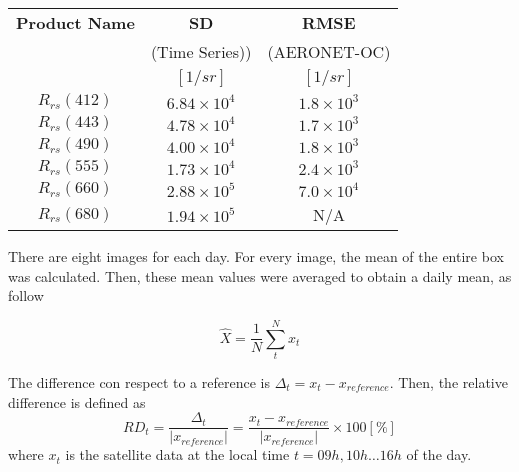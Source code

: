 \documentclass[onecolumn,3p,letterpaper,11pt]{elsarticle}
\begin{document}
\begin{table}[htbp!]
\caption{ \label{tab:stdev_aero} } 
\small
\centering
\begin{tabular}{ccc} \hline
 \bfseries{Product Name} & \bfseries{SD} & \bfseries{RMSE}\\
 & (Time Series)) & (AERONET-OC) \\ 
 & $[1/sr]$ & $[1/sr]$ \\ \hline \hline
$R_{rs}(412)$ & $6.84\times10^4$ & $1.8\times10^3$\\ 
$R_{rs}(443)$ & $4.78\times10^4$ & $1.7\times10^3$\\ 
$R_{rs}(490)$ & $4.00\times10^4$ & $1.8\times10^3$\\ 
$R_{rs}(555)$ & $1.73\times10^4$ & $2.4\times10^3$\\ 
$R_{rs}(660)$ & $2.88\times10^5$ & $7.0\times10^4$\\ 
$R_{rs}(680)$ & $1.94\times10^5$ & N/A \\ \hline
 \end{tabular}
\end{table}



There are eight images for each day. For every image, the mean of the entire box was calculated. Then, these mean values were averaged to obtain a daily mean, as follow

\begin{equation}
	\hat{X} = \frac{1}{N} \sum_{t}^N x_t
\end{equation}

The difference con respect to a reference is $\Delta_t=x_t-x_{reference}$. Then, the relative difference is defined as
\begin{equation}
	RD_t = \frac{\Delta_t}{|x_{reference}|} = \frac{x_t-x_{reference}}{|x_{reference}|}
	\times 100[\%]
\end{equation}
where $x_t$ is the satellite data at the local time $t=09h,10h\dots16h$ of the day.
\end{document}
